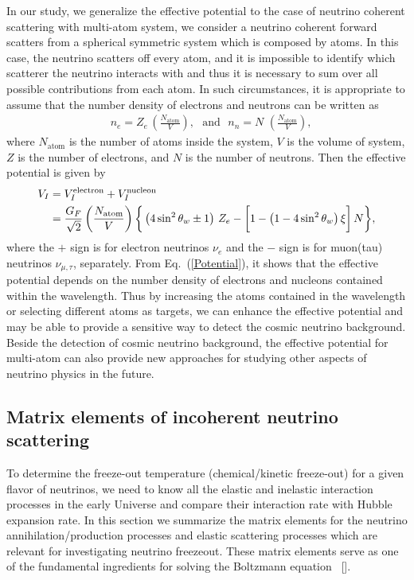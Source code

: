 In our study, we generalize the effective potential to the case of neutrino coherent scattering with multi-atom system, we consider a neutrino coherent forward scatters from a spherical symmetric system which is composed by atoms. In this case, the neutrino scatters off every atom, and it is impossible to identify which scatterer the neutrino interacts with and thus it is necessary to sum over all possible contributions from each atom. In such circumstances, it is appropriate to assume that the number density of electrons and neutrons can be written as
\begin{align}
&n_e=Z_e\,\left(\frac{N_\mathrm{atom}}{V}\right),\,\,\,\,\mathrm{and}\,\,\,\,n_n=N\,\,\left(\frac{N_\mathrm{atom}}{V}\right),
\end{align}
where $N_\mathrm{atom}$ is the number of atoms inside the system, $V$ is the volume of system, $Z$ is the number of electrons, and $N$ is the number of neutrons.
Then the effective potential is given by
\begin{align}
\label{Potential}
V_{I}&=V_I^{\mathrm{electron}}+V_I^{\mathrm{nucleon}}\notag\\&=\frac{G_F}{\sqrt{2}}\left(\frac{N_\mathrm{atom}}{V}\right)\bigg\{\left(4\sin^2\theta_w\pm1\right)\,Z_e-\bigg[1-\left(1-4\sin^2\theta_w\right)\xi\bigg]\,N\bigg\},
\end{align}
where the $+$ sign is for electron neutrinos $\nu_e$ and the $-$ sign is for muon(tau) neutrinos $\nu_{\mu,\tau}$, separately. 
From Eq.~(\ref{Potential}), it shows that the effective potential depends on the number density of electrons and nucleons contained within the wavelength. 
Thus by increasing the  atoms contained in the wavelength or selecting different atoms as targets, we can enhance the effective potential and may be able to provide a sensitive way to detect the cosmic neutrino background. Beside the detection of cosmic neutrino background, the effective potential for multi-atom can also provide new approaches for studying other aspects of neutrino physics in the future.

\subsection{Matrix elements of incoherent neutrino scattering}

To determine the freeze-out temperature (chemical/kinetic freeze-out) for a given flavor of neutrinos, we need to know all the elastic and inelastic interaction processes in the early Universe and compare their interaction rate with Hubble expansion rate. In this section we summarize the matrix elements for the neutrino annihilation/production processes and elastic scattering processes which are relevant for investigating neutrino freezeout. These matrix elements serve as one of the fundamental ingredients for solving the Boltzmann equation ~[\cite{Birrell:2014uka}].

